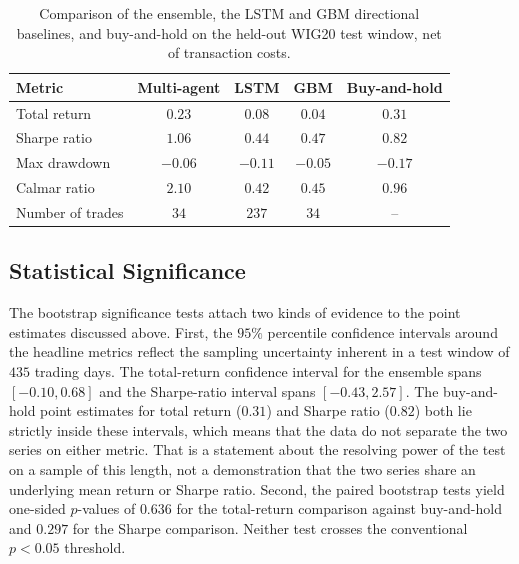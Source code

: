 \documentclass{ieeeaccess}
\newcommand{\TRtest}{\ensuremath{0.23}}
\newcommand{\TRtestCIlow}{\ensuremath{-0.10}}
\newcommand{\TRtestCIhigh}{\ensuremath{0.68}}
\newcommand{\Shtest}{\ensuremath{1.06}}
\newcommand{\ShtestCIlow}{\ensuremath{-0.43}}
\newcommand{\ShtestCIhigh}{\ensuremath{2.57}}
\newcommand{\MDDtest}{\ensuremath{-0.06}}
\newcommand{\Calmtest}{\ensuremath{2.10}}
\newcommand{\Ntrades}{\ensuremath{34}}
\newcommand{\BHtest}{\ensuremath{0.31}}
\newcommand{\BHsharpe}{\ensuremath{0.82}}
\newcommand{\MDDbh}{\ensuremath{-0.17}}
\newcommand{\Calmbh}{\ensuremath{0.96}}
\newcommand{\PvsBH}{\ensuremath{0.636}}
\newcommand{\PvsBHsharpe}{\ensuremath{0.297}}
\newcommand{\OOSDays}{\ensuremath{435}}
\newcommand{\LSTMtest}{\ensuremath{0.08}}
\newcommand{\LSTMsharpe}{\ensuremath{0.44}}
\newcommand{\LSTMmdd}{\ensuremath{-0.11}}
\newcommand{\LSTMcalmar}{\ensuremath{0.42}}
\newcommand{\LSTMtrades}{\ensuremath{237}}
\newcommand{\GBMtest}{\ensuremath{0.04}}
\newcommand{\GBMsharpe}{\ensuremath{0.47}}
\newcommand{\GBMmdd}{\ensuremath{-0.05}}
\newcommand{\GBMcalmar}{\ensuremath{0.45}}
\newcommand{\GBMtrades}{\ensuremath{34}}
\begin{document}
\begin{table}[t]
\centering
\caption{Comparison of the ensemble, the LSTM and GBM directional baselines, and buy-and-hold on the held-out WIG20 test window, net of transaction costs.}
\label{tab:lstm}
\begin{tabular}{lcccc}
\toprule
Metric & Multi-agent & LSTM & GBM & Buy-and-hold \\
\midrule
Total return     & $\TRtest$   & $\LSTMtest$   & $\GBMtest$   & $\BHtest$ \\
Sharpe ratio     & $\Shtest$   & $\LSTMsharpe$ & $\GBMsharpe$ & $\BHsharpe$ \\
Max drawdown     & $\MDDtest$  & $\LSTMmdd$    & $\GBMmdd$    & $\MDDbh$ \\
Calmar ratio     & $\Calmtest$ & $\LSTMcalmar$ & $\GBMcalmar$ & $\Calmbh$ \\
Number of trades & $\Ntrades$  & $\LSTMtrades$ & $\GBMtrades$ & -- \\
\bottomrule
\end{tabular}
\end{table}

\subsection{Statistical Significance}
\label{subsec:significance}

The bootstrap significance tests attach two kinds of evidence to the point estimates discussed above. First, the $95\%$ percentile confidence intervals around the headline metrics reflect the sampling uncertainty inherent in a test window of \OOSDays{} trading days. The total-return confidence interval for the ensemble spans $[\TRtestCIlow, \TRtestCIhigh]$ and the Sharpe-ratio interval spans $[\ShtestCIlow, \ShtestCIhigh]$. The buy-and-hold point estimates for total return (\BHtest{}) and Sharpe ratio (\BHsharpe{}) both lie strictly inside these intervals, which means that the data do not separate the two series on either metric. That is a statement about the resolving power of the test on a sample of this length, not a demonstration that the two series share an underlying mean return or Sharpe ratio. Second, the paired bootstrap tests yield one-sided $p$-values of \PvsBH{} for the total-return comparison against buy-and-hold and \PvsBHsharpe{} for the Sharpe comparison. Neither test crosses the conventional $p < 0.05$ threshold.
\end{document}
